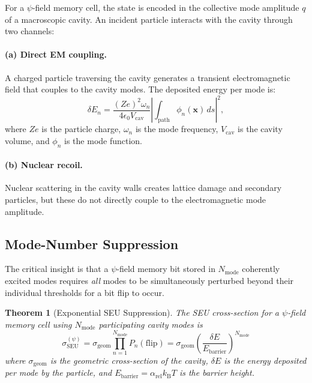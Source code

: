 \documentclass[11pt,twocolumn]{article}
\newtheorem{theorem}{Theorem}[section]
\theoremstyle{definition}
\theoremstyle{remark}
\newcommand{\kB}{k_{\mathrm{B}}}
\begin{document}
For a $\psi$-field memory cell, the state is encoded in the collective
mode amplitude $q$ of a macroscopic cavity. An incident particle
interacts with the cavity through two channels:

\paragraph{(a) Direct EM coupling.}
A charged particle traversing the cavity generates a transient
electromagnetic field that couples to the cavity modes. The deposited
energy per mode is:
\begin{equation}
\delta E_n = \frac{(Ze)^2\omega_n}{4\epsilon_0 V_{\mathrm{cav}}}
\left|\int_{\mathrm{path}} \phi_n(\mathbf{x})\,ds\right|^2,
\label{eq:em_coupling}
\end{equation}
where $Ze$ is the particle charge, $\omega_n$ is the mode frequency,
$V_{\mathrm{cav}}$ is the cavity volume, and $\phi_n$ is the mode
function.

\paragraph{(b) Nuclear recoil.}
Nuclear scattering in the cavity walls creates lattice damage and
secondary particles, but these do not directly couple to the
electromagnetic mode amplitude.

\subsection{Mode-Number Suppression}\label{sec:mode_suppression}

The critical insight is that a $\psi$-field memory bit stored in
$N_{\mathrm{mode}}$ coherently excited modes requires \emph{all} modes
to be simultaneously perturbed beyond their individual thresholds for a
bit flip to occur.

\begin{theorem}[Exponential SEU Suppression]
\label{thm:seu_suppression}
The SEU cross-section for a $\psi$-field memory cell using
$N_{\mathrm{mode}}$ participating cavity modes is
\begin{equation}
\boxed{
\sigma_{\mathrm{SEU}}^{(\psi)} = \sigma_{\mathrm{geom}}
\prod_{n=1}^{N_{\mathrm{mode}}} P_n(\mathrm{flip})
= \sigma_{\mathrm{geom}}\left(\frac{\delta E}{E_{\mathrm{barrier}}}\right)^{N_{\mathrm{mode}}}
}
\label{eq:seu_psi}
\end{equation}
where $\sigma_{\mathrm{geom}}$ is the geometric cross-section of the
cavity, $\delta E$ is the energy deposited per mode by the particle, and
$E_{\mathrm{barrier}} = \alpha_{\mathrm{rel}}\kB T$ is the barrier
height.
\end{theorem}
\end{document}
